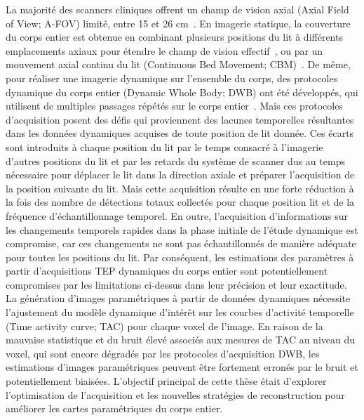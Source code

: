 \documentclass[a4paper]{article}
\begin{document}
La majorité des scanners cliniques offrent un champ de vision axial (Axial Field of View; A-FOV) limité, entre 15 et 26 cm~\cite{Vandenberghe2020}. En imagerie statique, la couverture du corps entier est obtenue en combinant plusieurs positions du lit à différents emplacements axiaux pour étendre le champ de vision effectif~\cite{Schubert1996}, ou par un mouvement axial continu du lit (Continuous Bed Movement; CBM)~\cite{Panin2014}.
De même, pour réaliser une imagerie dynamique sur l'ensemble du corps, des protocoles dynamique du corps entier (Dynamic Whole Body; DWB) ont été développés, qui utilisent de multiples passages répétés sur le corps entier~\cite{Karakatsanis2011,Karakatsanis2013,Rahmim2019}. 
Mais ces protocoles d'acquisition posent des défis qui proviennent des lacunes temporelles résultantes dans les données dynamiques acquises de toute position de lit donnée. Ces écarts sont introduits à chaque position du lit par le temps consacré à l'imagerie d'autres positions du lit et par les retards du système de scanner dus au temps nécessaire pour déplacer le lit dans la direction axiale et préparer l'acquisition de la position suivante du lit. Mais cette acquisition résulte en une forte réduction à la fois des nombre de détections totaux collectés pour chaque position lit et de la fréquence d'échantillonnage temporel. En outre, l'acquisition d'informations sur les changements temporels rapides dans la phase initiale de l'étude dynamique est compromise, car ces changements ne sont pas échantillonnés de manière adéquate pour toutes les positions du lit. Par conséquent, les estimations des paramètres à partir d'acquisitions TEP dynamiques du corps entier sont potentiellement compromises par les limitations ci-dessus dans leur précision et leur exactitude.
La génération d'images paramétriques à partir de données dynamiques nécessite l'ajustement du modèle dynamique d'intérêt sur les courbes d'activité temporelle (Time activity curve; TAC) pour chaque voxel de l'image. En raison de la mauvaise statistique et du bruit élevé associés aux mesures de TAC au niveau du voxel, qui sont encore dégradés par les protocoles d'acquisition DWB, les estimations d'images paramétriques peuvent être fortement erronés par le bruit et potentiellement biaisées.
L'objectif principal de cette thèse était d'explorer l'optimisation de l'acquisition et les nouvelles stratégies de reconstruction pour améliorer les cartes paramétriques du corps entier. 
\end{document}
